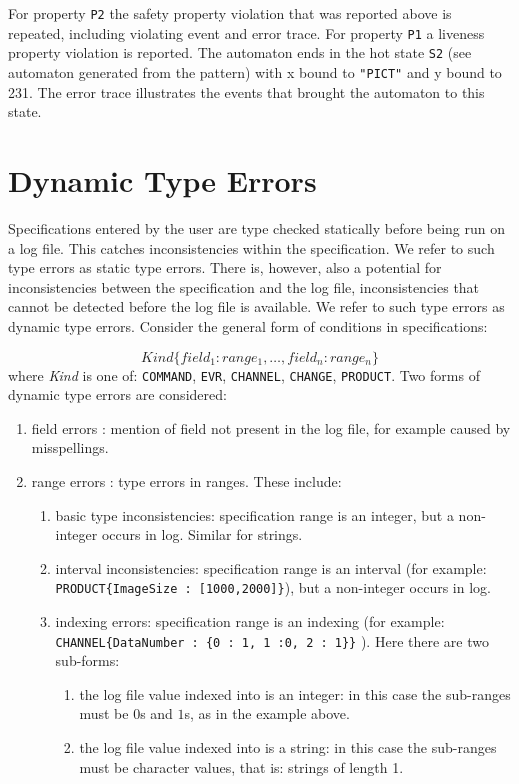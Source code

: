 \documentclass{report}
\begin{document}
For property {\tt P2} the safety property violation that was reported above is repeated,
including violating event and error trace. For property {\tt P1} a liveness property violation
is reported. The automaton ends in the hot state {\tt S2} (see automaton generated from
the pattern) with x bound to {\tt "PICT"} and y bound to 231. The error trace illustrates the events that brought the automaton to this state.

\section{Dynamic Type Errors}

Specifications entered by the user are type checked statically before being run on a log file. This
catches inconsistencies within the specification. We refer to
such type errors as static type errors. There is, however, also a potential for inconsistencies between the specification and the log file, inconsistencies that cannot be detected before the log file is available. We
refer to such type errors as dynamic type errors. Consider the general form of conditions in specifications:

\[
Kind\{field_1 : range_1,\ldots,field_n : range_n\} 
\]
where {\em Kind} is one of:
{\tt COMMAND}, {\tt EVR}, {\tt CHANNEL}, {\tt CHANGE}, {\tt PRODUCT}.
Two forms of dynamic type errors are considered:

\begin{enumerate}
  \item field errors : mention of field not present in the log file, for example caused by misspellings.
  \item range errors : type errors in ranges. These include:
  \begin{enumerate}
     \item basic type inconsistencies: specification range is an integer, but a non-integer occurs in log. 
              Similar for strings.
     \item interval inconsistencies: specification range is an interval 
             (for example: \verb+PRODUCT{ImageSize : [1000,2000]}+), but a non-integer occurs in log.
	\item indexing errors: specification range is an indexing 
	         (for example:\\ \verb+CHANNEL{DataNumber : {0 : 1, 1 :0, 2 : 1}}+ ). 
	         Here there are two sub-forms:
	         \begin{enumerate}
	           \item the log file value indexed into is an integer: in this case the sub-ranges must be $0$s and
	                   $1$s, as in the example above.
	           \item the log file value indexed into is a string: in this case the sub-ranges must be character
	                   values, that is: strings of length 1.
	         \end{enumerate}
  \end{enumerate}
\end{enumerate}
\end{document}
